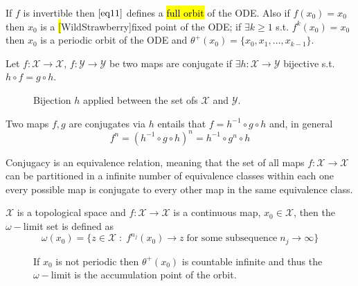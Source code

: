 \documentclass[../main.tex]{subfiles}
\begin{document}
\begin{observation}\label{obs2}
        If $f$ is invertible then $\ref{eq11}$ defines a \hl{full orbit} of the ODE. Also if $f(x_{0})=x_{0}$ then $x_{0}$ is a \hl[WildStrawberry]{fixed point} of the ODE; if $\exists k \geq 1$ s.t. $f^{k}(x_{0}) = x_{0}$ then $x_{0}$ is a periodic orbit of the ODE and $\theta^{+}(x_{0}) = \{x_{0},x_{1},\dots,x_{k-1}\}$.
\end{observation}
\begin{definition}[]\label{def6}
     Let $f:\mathcal{X}\to \mathcal{X}$, $f:\mathcal{Y}\to \mathcal{Y}$ be two maps are conjugate if $\exists h:\mathcal{X}\to \mathcal{Y}$ bijective s.t. $h\circ f = g \circ h$.
     \begin{figure}[H]
         \centering 
         \caption{Bijection $h$ applied between the set ofs $\mathcal{X}$ and $\mathcal{Y}$.}
         \label{fig2}
     \end{figure}
\end{definition}
\begin{observation}\label{obs3}
     Two maps $f,g$ are conjugates via $h$ entails that $f=h^{-1}\circ g \circ h$ and, in general
     \begin{equation}\label{eq12}
          f^{n}=(h^{-1}\circ g \circ h)^{n}=h^{-1} \circ g^{n} \circ h
     \end{equation}
\end{observation}
\begin{observation}\label{obs4}
     Conjugacy is an equivalence relation, meaning that the set of all maps $f: \mathcal{X}\to \mathcal{X}$ can be partitioned in a infinite number of equivalence classes within each one  every possible map is conjugate to every other map in the same equivalence class.
\end{observation}
\begin{definition}[]\label{def7}
     $\mathcal{X}$ is a topological space and $f:\mathcal{X}\to \mathcal{X}$ is a continuous map, $x_{0}\in \mathcal{X}$, then the $\omega-$limit set is defined as
     \begin{equation}\label{eq13}
             \omega(x_{0}) = \{z\in \mathcal{X}\;:\; f^{n_{j}}(x_{0}) \to z \; \text{for some subsequence} \; n_{j}\to\infty\}
     \end{equation}
\begin{figure}[H]
    \centering 
    \caption{If $x_{0}$ is not periodic then $\theta^{+}(x_{0})$ is countable infinite and thus the $\omega-$limit is the accumulation point of the orbit.}
    \label{fig3}
\end{figure}
\end{definition}
\end{document}
